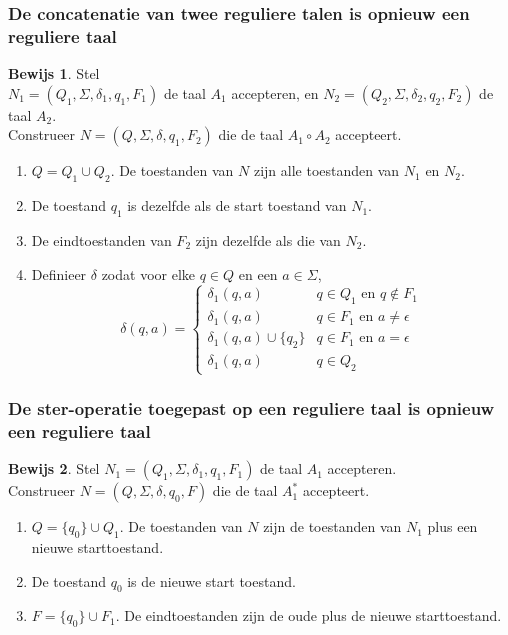 \documentclass[12pt,a4paper]{article}
\theoremstyle{definition}
\newtheorem{bewijs}{Bewijs}[section]
\begin{document}
\subsubsection{De concatenatie van twee reguliere talen is opnieuw een reguliere taal}
\begin{bewijs}
Stel\\
 $N_1 = (Q_1,\Sigma,\delta_1,q_1,F_1)$ de taal $A_1$ accepteren,
  en $N_2 = (Q_2,\Sigma,\delta_2,q_2,F_2)$ de taal $A_2$.\\

Construeer $N=(Q,\Sigma,\delta,q_1,F_2)$ die de taal $A_1 \circ A_2$ accepteert.
\begin{enumerate}
\item $Q=Q_1\cup Q_2$. De toestanden van $N$ zijn alle toestanden van $N_1$ en $N_2$.
\item De toestand $q_1$ is dezelfde als de start toestand van $N_1$.
\item De eindtoestanden van $F_2$ zijn dezelfde als die van $N_2$.
\item Definieer $\delta$ zodat voor elke $q \in Q$ en een $a\in\Sigma$,
$$
\delta(q,a) = \left\{
    \begin{array}{ll}
        \delta_1(q,a) & q\in Q_1 \text{ en } q\notin F_1 \\
        \delta_1(q,a) & q\in F_1 \text{ en } a\neq \epsilon \\
        \delta_1(q,a)\cup \{q_2\} & q\in F_1 \text{ en } a=\epsilon \\
        \delta_1(q,a) & q\in Q_2
    \end{array}
\right.
$$
\end{enumerate}
\end{bewijs}
\subsubsection{De ster-operatie toegepast op een reguliere taal is opnieuw een reguliere taal}
\begin{bewijs}
Stel $N_1 = (Q_1,\Sigma,\delta_1,q_1,F_1)$ de taal $A_1$ accepteren.\\

Construeer $N=(Q,\Sigma,\delta,q_0,F)$ die de taal $A^*_1$ accepteert.
\begin{enumerate}
\item $Q=\{q_0\} \cup Q_1$. De toestanden van $N$ zijn de toestanden van $N_1$ plus een nieuwe starttoestand.
\item De toestand $q_0$ is de nieuwe start toestand.
\item $F = \{q_0\}\cup F_1$. De eindtoestanden zijn de oude plus de nieuwe starttoestand.
\end{enumerate}
\end{bewijs}
\end{document}

